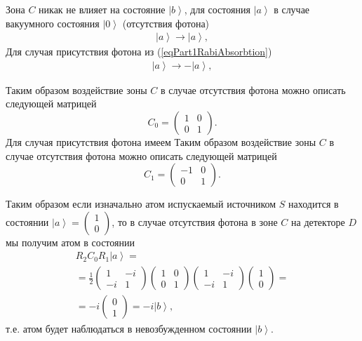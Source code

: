 Зона $C$ никак не влияет на состояние $\left|b\right>$, для состояния
$\left|a\right>$ в случае вакуумного состояния $\left|0\right>$
(отсутствия фотона)
\begin{eqnarray}
  \left|a\right> \rightarrow \left|a\right>,
  \nonumber
\end{eqnarray}
Для случая присутствия фотона из (\ref{eqPart1RabiAbsorbtion})
\begin{eqnarray}
  \left|a\right> \rightarrow -\left|a\right>,
  \nonumber
\end{eqnarray}

Таким образом воздействие зоны $C$ в случае отсутствия фотона можно
описать следующей матрицей
\[
C_0 = \left(
\begin{array} {cc}
1 & 0
\\
0 & 1 
\end{array}
\right).
\]
Для случая присутствия фотона имеем
Таким образом воздействие зоны $C$ в случае отсутствия фотона можно
описать следующей матрицей
\[
C_1 = \left(
\begin{array} {cc}
-1 & 0
\\
0 & 1 
\end{array}
\right).
\]

Таким образом если изначально атом испускаемый источником $S$
находится в состоянии $\left|a\right> = \left(
\begin{array} {c}
1
\\
0
\end{array}
\right)$, то в случае отсутствия фотона в зоне $C$ на детекторе $D$ мы
получим атом в состоянии
\begin{eqnarray}
  R_2 C_0 R_1 \left|a\right> =
  \nonumber \\
  =
  \frac{1}{2}
  \left(
  \begin{array} {cc}
    1 & -i
    \\
    -i & 1 
  \end{array}
  \right)
  \left(
  \begin{array} {cc}
    1 & 0
    \\
    0 & 1 
  \end{array}
  \right)
  \left(
  \begin{array} {cc}
    1 & -i
    \\
    -i & 1 
  \end{array}
  \right)
  \left(
  \begin{array} {c}
    1
    \\
    0
  \end{array}
  \right) =
  \nonumber \\
  =
  -i 
  \left(
  \begin{array} {c}
    0
    \\
    1
  \end{array}
  \right) =
  -i \left|b\right>,
  \nonumber
\end{eqnarray}
т.е. атом будет наблюдаться в невозбужденном состоянии
$\left|b\right>$.

